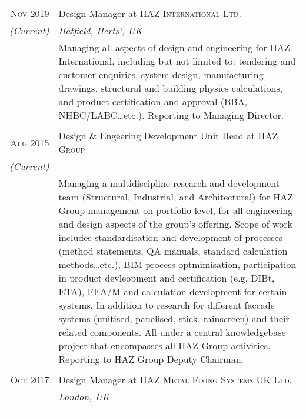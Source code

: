 \documentclass[a4paper,11pt]{article} %
\begin{document}
\begin{tabular}{r|p{11cm}}

\textsc{Nov 2019} & Design Manager at \textsc{HAZ International Ltd.}\\
\emph{(Current)} & \emph{Hatfield, Herts', UK} \\
& \footnotesize{Managing all aspects of design and engineering for HAZ International, including but not limited to: tendering and customer enquiries, system design, manufacturing drawings, structural and building physics calculations, and product certification and approval (BBA, NHBC/LABC\ldots{}etc.). Reporting to Managing Director.}\\
\multicolumn{2}{c}{} \\


\textsc{Aug 2015} & Design \& Engeering Development Unit Head at \textsc{HAZ Group}\\
\emph{(Current)} &  \\
& \footnotesize{Managing a multidiscipline research and development team (Structural, Industrial, and Architectural) for HAZ Group management on portfolio level, for all engineering and design aspects of the group's offering. Scope of work includes standardisation and development of processes (method statements, QA manuals, standard calculation methods\ldots etc.), BIM process optmimisation, participation in product devleopment and certification (e.g. DIBt, ETA), FEA/M and calculation development for certain systems. In addition to research for different fac{c}ade systems (unitised, panelised, stick, rainscreen) and their related components. All under a central knowledgebase project that encompasses all HAZ Group activities. Reporting to HAZ Group Deputy Chairman.}\\
\multicolumn{2}{c}{} \\


\textsc{Oct 2017} & Design Manager at \textsc{HAZ Metal Fixing Systems UK Ltd.}\\
& \emph{London, UK} \\
& \footnotesize{}\\
\multicolumn{2}{c}{} \\





\end{tabular}
\end{document}
